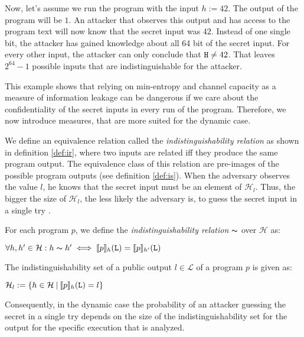 Now, let's assume we run the program with the input $h := 42$. The output of the program will be $1$. An attacker that observes this output and has access to the program text will now know that the secret input was $42$. Instead of one single bit, the attacker has gained knowledge about all 64 bit of the secret input. For every other input, the attacker can only conclude that $\mathtt{H} \neq 42$. That leaves $2^{64} - 1$ possible inputs that are indistinguishable for the attacker. 

This example shows that relying on min-entropy and channel capacity as a measure of information leakage can be dangerous if we care about the confidentiality of the secret inputs in every run of the program. Therefore, we now introduce measures, that are more suited for the dynamic case.

We define an equivalence relation called the \emph{indistinguishability relation} as shown in definition \ref{def:ir}, where two inputs are related iff they produce the same program output. The equivalence class of this relation are pre-images of the possible program outputs (see definition \ref{def:is}). When the adversary observes the value $l$, he knows that the secret input must be an element of $\mathcal{H}_l$. Thus, the bigger the size of $\mathcal{H}_l$, the less likely the adversary is, to guess the secret input in a single try \cite{backes09, smith09, alvim19}. 

\begin{definition}\label{def:ir}
        For each program $p$, we define the \emph{indistinguishability relation} $\thicksim$ over $\mathcal{H}$ as:
        \begin{center}
            $\forall h, h' \in \mathcal{H}: h \thicksim  h' \iff \llbracket p \rrbracket_h(\mathtt{L}) = \llbracket p \rrbracket_{h'}(\mathtt{L})$
        \end{center}
\end{definition}

\begin{definition}\label{def:is}
    The indistinguishability set of a public output $l \in \mathcal{L}$ of a program $p$ is given as:
    \begin{center}
        $\mathcal{H}_l :=\{ h \in \mathcal{H} \: | \: \llbracket p \rrbracket_h(\mathtt{L}) = l \}$
    \end{center}
\end{definition}

Consequently, in the dynamic case the probability of an attacker guessing the secret in a single try depends on the size of the indistinguishability set for the output for the specific execution that is analyzed.

